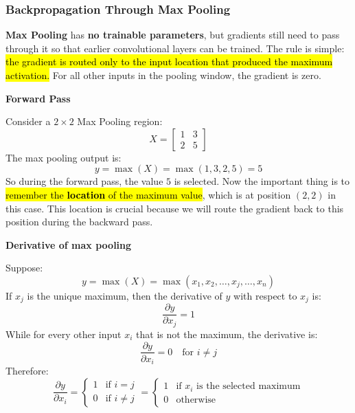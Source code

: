 \subsubsection{Backpropagation Through Max Pooling}\label{sec:backpropagation-through-max-pooling}

\textbf{Max Pooling} has \textbf{no trainable parameters}, but gradients still need to pass through it so that earlier convolutional layers can be trained. The rule is simple: \hl{the gradient is routed only to the input location that produced the maximum activation.} For all other inputs in the pooling window, the gradient is zero.

\highspace
\begin{flushleft}
    \textcolor{Green3}{ \textbf{Forward Pass}}
\end{flushleft}
Consider a $2\times2$ Max Pooling region:
\begin{equation*}
    X=
    \begin{bmatrix}
        1 & 3\\
        2 & 5
    \end{bmatrix}
\end{equation*}
The max pooling output is:
\begin{equation*}
    y = \max(X) = \max(1, 3, 2, 5) = 5
\end{equation*}
So during the forward pass, the value $5$ is selected. Now the important thing is to \hl{remember the \textbf{location} of the maximum value}, which is at position $(2, 2)$ in this case. This location is crucial because we will route the gradient back to this position during the backward pass.

\highspace
\begin{flushleft}
    \textcolor{Green3}{ \textbf{Derivative of max pooling}}
\end{flushleft}
Suppose:
\begin{equation*}
    y = \max(X) = \max\left(x_1, x_2, \dots, x_j, \dots, x_n\right)
\end{equation*}
If $x_j$ is the unique maximum, then the derivative of $y$ with respect to $x_j$ is:
\begin{equation*}
    \frac{\partial y}{\partial x_j} = 1
\end{equation*}
While for every other input $x_i$ that is not the maximum, the derivative is:
\begin{equation*}
    \frac{\partial y}{\partial x_i} = 0 \quad \text{for } i \neq j
\end{equation*}
Therefore:
\begin{equation*}
    \frac{\partial y}{\partial x_i} =
    \begin{cases}
        1 & \text{if } i = j\\
        0 & \text{if } i \neq j
    \end{cases} =
    \begin{cases}
        1  & \text{if } x_i \text{ is the selected maximum}\\
        0  & \text{otherwise}
    \end{cases}
\end{equation*}

